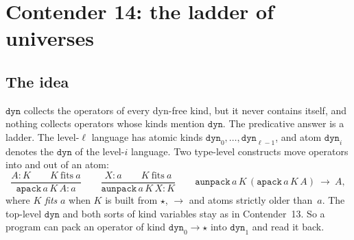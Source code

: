 \documentclass[11pt]{article}
\theoremstyle{definition}
\theoremstyle{remark}
\begin{document}
\section{Contender 14: the ladder of universes}

\subsection{The idea}
$\mathtt{dyn}$ collects the operators of every dyn-free kind, but it never
contains itself, and nothing collects operators whose kinds mention
$\mathtt{dyn}$. The predicative answer is a ladder. The level-$\ell$ language
has atomic kinds $\mathtt{dyn}_0,\dots,\mathtt{dyn}_{\ell-1}$, and atom
$\mathtt{dyn}_i$ denotes the $\mathtt{dyn}$ of the level-$i$ language. Two
type-level constructs move operators into and out of an atom:
\[
\frac{A:K\qquad K\ \text{fits}\ a}{\mathtt{apack}\,a\,K\,A : a}
\qquad
\frac{X:a\qquad K\ \text{fits}\ a}{\mathtt{aunpack}\,a\,K\,X : K}
\qquad
\mathtt{aunpack}\,a\,K\,(\mathtt{apack}\,a\,K\,A)\ \longrightarrow\ A,
\]
where $K$ \emph{fits} $a$ when $K$ is built from $\star$, $\to$ and atoms
strictly older than~$a$. The top-level $\mathtt{dyn}$ and both sorts of kind
variables stay as in Contender~13. So a program can pack an operator of kind
$\mathtt{dyn}_0\to\star$ into $\mathtt{dyn}_1$ and read it back.
\end{document}
